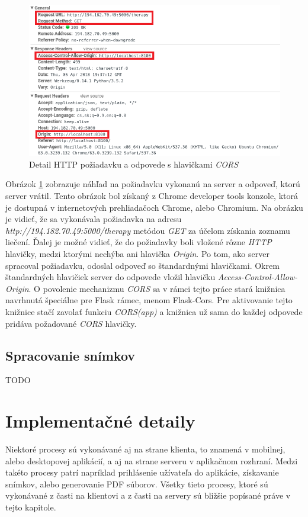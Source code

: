 \begin{figure}[h]
  \centering
  \includegraphics[scale=0.8]{fig/cors.png}
  \caption{Detail HTTP požiadavku a odpovede s hlavičkami \textit{CORS}}
  \label{fig:cors}
\end{figure}
Obrázok \ref{fig:cors} zobrazuje náhľad na požiadavku vykonanú na server a odpoveď, ktorú server vrátil. Tento obrázok bol získaný z Chrome developer tools konzole, ktorá je dostupná v internetových prehliadačoch Chrome, alebo Chromium. Na obrázku je vidieť, že sa vykonávala požiadavka na adresu \textit{http://194.182.70.49:5000/therapy} metódou \textit{GET} za účelom získania zoznamu liečení. Ďalej je možné vidieť, že do požiadavky boli vložené rôzne \textit{HTTP} hlavičky, medzi ktorými nechýba ani hlavička \textit{Origin}. Po tom, ako server spracoval požiadavku, odoslal odpoveď so štandardnými hlavičkami. Okrem štandardných hlavičiek server do odpovede vložil hlavičku \textit{Access-Control-Allow-Origin}. O povolenie mechanizmu \textit{CORS} sa v rámci tejto práce stará knižnica navrhnutá špeciálne pre Flask rámec, menom Flask-Cors.  Pre aktivovanie tejto knižnice stačí zavolať funkciu \textit{CORS(app)} a knižnica už sama do každej odpovede pridáva požadované \textit{CORS} hlavičky.

\subsection{Spracovanie snímkov}
TODO

\section{Implementačné detaily}
Niektoré procesy sú vykonávané aj na strane klienta, to znamená v mobilnej, alebo desktopovej aplikácií, a aj na strane serveru v aplikačnom rozhraní. Medzi takéto procesy patrí napríklad prihlásenie užívateľa do aplikácie, získavanie snímkov, alebo generovanie PDF súborov. Všetky tieto procesy, ktoré sú vykonávané z časti na klientovi a z časti na servery sú bližšie popísané práve v tejto kapitole.

